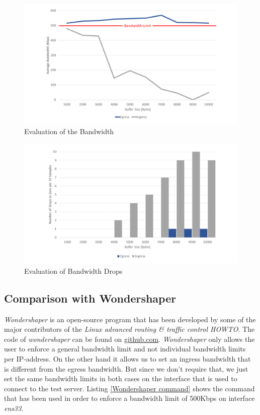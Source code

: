 \begin{figure}[h]
	\centering
	\includegraphics[width=\textwidth]{img/Evaluation-Bandwidth.png}
	\caption{Evaluation of the Bandwidth}
	\label{Evaluation of the Bandwidth}
\end{figure}

\begin{figure}[h]
	\centering
	\includegraphics[width=\textwidth]{img/Evaluation-Zeros.png}
	\caption{Evaluation of Bandwidth Drops}
	\label{Evaluation of the Bandwidth Drops}
\end{figure}
\newpage
\textit{ }
\newpage
\subsection{Comparison with Wondershaper}

\textit{Wondershaper} is an open-source program that has been developed by some of the major contributors of the \textit{Linux advanced routing \& traffic control HOWTO}\cite
{hubert2002linux}. The code of \textit{wondershaper} can be found on \href{https://github.com/magnific0/wondershaper}{github.com}\cite{hubert2002wondershaper}. \textit{Wondershaper} only allows the user to enforce a general bandwidth limit and not individual bandwidth limits per \acs{IP}-address. On the other hand it allows us to set an ingress bandwidth that is different from the egress bandwidth. But since we don't require that, we just set the same bandwidth limits in both cases on the interface that is used to connect to the test server. Listing \ref{Wondershaper command} shows the command that has been used in order to enforce a bandwidth limit of 500Kbps on interface \textit{ens33}.

